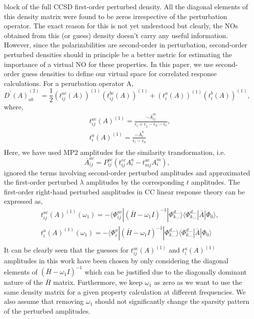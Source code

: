block of the full CCSD first-order perturbed density. All the diagonal elements of this density 
matrix were found to be zeros irrespective of the perturbation operator. The exact reason for this
is not yet understood but clearly, the NOs obtained from this (or guess) density doesn't carry any useful
information. However, since the polarizabilities are second-order in perturbation, second-order perturbed densities 
should in principle be a better metric for estimating the importance of a virtual NO for these properties.
In this paper, we use second-order guess densities to define our virtual space for correlated response calculations.
For a perurbation operator A,
\begin{equation}
{D^{'}(A)}^{(2)}_{ab} = \frac{1}{2}(t^{ac}_{ij}(A))^{(1)}(t^{bc}_{ij}(A))^{(1)} + (t^{a}_{i}(A))^{(1)} (t^{b}_{i}(A))^{(1)}, 
\end{equation}
where,
\begin{equation}
\begin{split}
& t^{ac}_{ij}(A)^{(1)} = \frac{-\bar{A}^{ac}_{ij}}{\epsilon_i + \epsilon_j - \epsilon_a - \epsilon_c},\\
& t^{a}_{i}(A)^{(1)} = \frac{-\bar{A}^{a}_{i}}{\epsilon_i - \epsilon_a}\\
\end{split}
\end{equation}
Here, we have used MP2 amplitudes for the similarity transformation, i.e. 
\begin{equation}
\bar{A}^{ac}_{ij} = P_{ij}^{ac}(t^{ec}_{ij}A^a_e - t^{ac}_{mj}A^m_i) ,
\end{equation}
ignored the terms involving second-order perturbed amplitudes and 
approximated the first-order perturbed $\lambda$ amplitudes by the 
corresponding $t$ amplitudes. The first-order right-hand perturbed
amplitudes in CC linear response theory can be expressed as, 
\begin{equation}
\begin{split}
& t^{ac}_{ij}(A)^{(1)}(\omega_1) = - \langle\Phi_{ij}^{ac}| {(\bar{H} -\omega_1 I)}^{-1} |
\Phi_{k\ldots}^{d\ldots}\rangle \langle \Phi_{k\ldots}^{d\ldots}| \bar{A} | \Phi_0\rangle, \\
& t^{a}_{i}(A)^{(1)}(\omega_1) = - \langle\Phi_{i}^{a}| {(\bar{H} -\omega_1 I)}^{-1} |
\Phi_{k\ldots}^{d\ldots}\rangle \langle \Phi_{k\ldots}^{d\ldots}| \bar{A} | \Phi_0\rangle \\
\end{split}
\end{equation}
It can be clearly seen that the guesses for $t^{ac}_{ij}(A)^{(1)}$ and 
$t^{a}_{i}(A)^{(1)}$ amplitudes in this work have been chosen by 
only considering the diagonal elements of $(\bar{H} -\omega_1 I)^{-1}$
which can be justified due to the diagonally dominant nature of the
$\bar{H}$ matrix. Furthermore, we keep $\omega_1$ as zero as we 
want to use the same density matrix for a given property calculation at different
frequencies. We also assume that removing $\omega_1$ should not significantly change the 
sparsity pattern of the perturbed amplitudes. 
